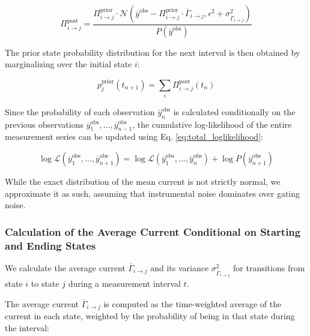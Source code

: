 \documentclass[pdflatex,sn-mathphys-num]{sn-jnl}%
\theoremstyle{thmstyleone}%
\theoremstyle{thmstyletwo}%
\theoremstyle{thmstylethree}%
\begin{document}
\begin{equation}
	\Pi_{i \rightarrow j}^{\text{post}} = \frac{\Pi_{i \rightarrow j}^{\text{prior}} \cdot \mathcal{N}\left(\overline{y}^{\text{obs}} - \Pi_{i \rightarrow j}^{\text{prior}} \cdot \overline{\Gamma}_{i \rightarrow j}, \epsilon^2 + \sigma^2_{\overline{\Gamma}_{i \rightarrow j}}\right)}{P(\overline{y}^{\text{obs}})}
	\label{eq:single_channel_integrated_posterior}
\end{equation}

The prior state probability distribution for the next interval is then obtained by marginalizing over the initial state \( i \):

\begin{equation}
	p_j^{\text{prior}}(t_{n+1}) = \sum_i \Pi_{i \rightarrow j}^{\text{post}}(t_n)
	\label{eq:single_channel_integrated_next_prior}
\end{equation}

Since the probability of each observation \( \overline{y}_n^{\text{obs}} \) is calculated conditionally on the previous observations \( \overline{y}_1^{\text{obs}}, \dots, \overline{y}_{n-1}^{\text{obs}} \), the cumulative log-likelihood of the entire measurement series can be updated using Eq. \ref{eq:total_loglikelihood}:

\begin{equation}
	\log \mathcal{L}(\overline{y}_1^{\text{obs}}, \dots, \overline{y}_{n+1}^{\text{obs}}) = \log \mathcal{L}(\overline{y}_1^{\text{obs}}, \dots, \overline{y}_n^{\text{obs}}) + \log P(\overline{y}_{n+1}^{\text{obs}})
	\label{eq:single_channel_integrated_total_likelihood}
\end{equation}

While the exact distribution of the mean current is not strictly normal, we approximate it as such, assuming that instrumental noise dominates over gating noise.

\subsubsection{Calculation of the Average Current Conditional on Starting and Ending States}

We calculate the average current \( \overline{\Gamma}_{i \rightarrow j} \) and its variance \( \sigma^2_{\overline{\Gamma}_{i \rightarrow j}} \) for transitions from state \( i \) to state \( j \) during a measurement interval \( t \).

The average current \( \overline{\Gamma}_{i \rightarrow j} \) is computed as the time-weighted average of the current in each state, weighted by the probability of being in that state during the interval:
\end{document}
